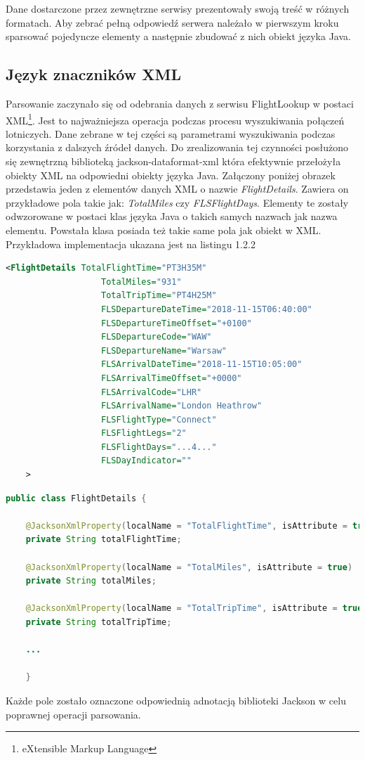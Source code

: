 \documentclass[12pt, twoside]{report}
\begin{document}
Dane dostarczone przez zewnętrzne serwisy prezentowały swoją treść w różnych formatach. Aby zebrać pełną odpowiedź serwera należało w pierwszym kroku sparsować pojedyncze elementy a następnie zbudować z nich obiekt języka Java.
\subsection{Język znaczników XML}
Parsowanie zaczynało się od odebrania danych z serwisu FlightLookup w postaci XML\footnote{eXtensible Markup Language}. Jest to najważniejsza operacja podczas procesu wyszukiwania połączeń lotniczych. Dane zebrane w tej części są parametrami wyszukiwania podczas korzystania z dalszych źródeł danych.
Do zrealizowania tej czynności posłużono się zewnętrzną biblioteką jackson-dataformat-xml która efektywnie przełożyła obiekty XML na odpowiedni obiekty języka Java. Załączony poniżej obrazek przedstawia jeden z elementów danych XML o nazwie \textit{FlightDetails}. Zawiera on przykładowe pola takie jak: \textit{TotalMiles} czy \textit{FLSFlightDays}. Elementy te zostały odwzorowane w postaci klas języka Java o takich samych nazwach jak nazwa elementu. Powstała klasa posiada też takie same pola jak obiekt w XML.\\Przykładowa implementacja ukazana jest na listingu 1.2.2

\begin{lstlisting}[language=XML, caption=Fragment danych w formacie XML]
    <FlightDetails TotalFlightTime="PT3H35M"
                   TotalMiles="931"
                   TotalTripTime="PT4H25M"
                   FLSDepartureDateTime="2018-11-15T06:40:00"
                   FLSDepartureTimeOffset="+0100"
                   FLSDepartureCode="WAW"
                   FLSDepartureName="Warsaw"
                   FLSArrivalDateTime="2018-11-15T10:05:00"
                   FLSArrivalTimeOffset="+0000"
                   FLSArrivalCode="LHR"
                   FLSArrivalName="London Heathrow"
                   FLSFlightType="Connect"
                   FLSFlightLegs="2"
                   FLSFlightDays="...4..."
                   FLSDayIndicator=""
    >
\end{lstlisting}
\newpage
\begin{lstlisting}[language=java, caption=Fragment odwzorowanego obiektu XML w postaci klasy Java]
   public class FlightDetails {

    @JacksonXmlProperty(localName = "TotalFlightTime", isAttribute = true)
    private String totalFlightTime;

    @JacksonXmlProperty(localName = "TotalMiles", isAttribute = true)
    private String totalMiles;

    @JacksonXmlProperty(localName = "TotalTripTime", isAttribute = true)
    private String totalTripTime;
    
    ...

    }
\end{lstlisting}
Każde pole zostało oznaczone odpowiednią adnotacją biblioteki Jackson w celu poprawnej operacji parsowania.
\end{document}
